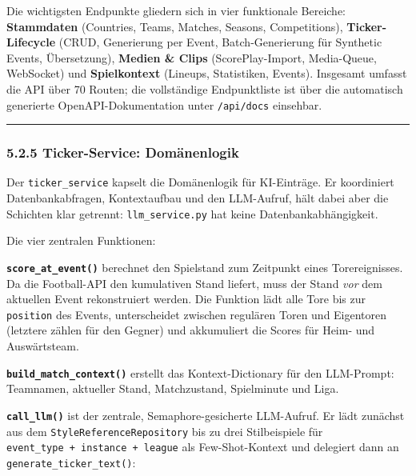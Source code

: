 Die wichtigsten Endpunkte gliedern sich in vier funktionale Bereiche:
\textbf{Stammdaten} (Countries, Teams, Matches, Seasons, Competitions),
\textbf{Ticker-Lifecycle} (CRUD, Generierung per Event,
Batch-Generierung für Synthetic Events, Übersetzung), \textbf{Medien \&
Clips} (ScorePlay-Import, Media-Queue, WebSocket) und
\textbf{Spielkontext} (Lineups, Statistiken, Events). Insgesamt umfasst
die API über 70 Routen; die vollständige Endpunktliste ist über die
automatisch generierte OpenAPI-Dokumentation unter \texttt{/api/docs}
einsehbar.

\begin{center}\rule{0.5\linewidth}{0.5pt}\end{center}

\subsubsection{5.2.5 Ticker-Service:
Domänenlogik}\label{ticker-service-domuxe4nenlogik}

Der \texttt{ticker\_service} kapselt die Domänenlogik für KI-Einträge.
Er koordiniert Datenbankabfragen, Kontextaufbau und den LLM-Aufruf, hält
dabei aber die Schichten klar getrennt: \texttt{llm\_service.py} hat
keine Datenbankabhängigkeit.

Die vier zentralen Funktionen:

\textbf{\texttt{score\_at\_event()}} berechnet den Spielstand zum
Zeitpunkt eines Torereignisses. Da die Football-API den kumulativen
Stand liefert, muss der Stand \emph{vor} dem aktuellen Event
rekonstruiert werden. Die Funktion lädt alle Tore bis zur
\texttt{position} des Events, unterscheidet zwischen regulären Toren und
Eigentoren (letztere zählen für den Gegner) und akkumuliert die Scores
für Heim- und Auswärtsteam.

\textbf{\texttt{build\_match\_context()}} erstellt das
Kontext-Dictionary für den LLM-Prompt: Teamnamen, aktueller Stand,
Matchzustand, Spielminute und Liga.

\textbf{\texttt{call\_llm()}} ist der zentrale, Semaphore-gesicherte
LLM-Aufruf. Er lädt zunächst aus dem \texttt{StyleReferenceRepository}
bis zu drei Stilbeispiele für
\texttt{event\_type\ +\ instance\ +\ league} als Few-Shot-Kontext und
delegiert dann an \texttt{generate\_ticker\_text()}:

\begin{Shaded}
\begin{Highlighting}[]
 
     
\OperatorTok{=}
\OperatorTok{=}
\NormalTok{    )}
\end{Highlighting}
\end{Shaded}

